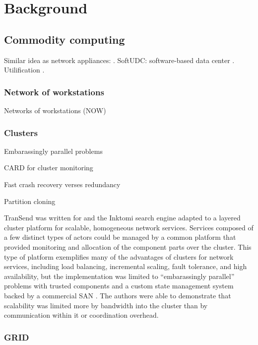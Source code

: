 \chapter{Background}



\section{Commodity computing}

Similar idea as network appliances: \cite{sapuntzakis03}. SoftUDC: software-based data center \cite{kallahalla}. Utilification \cite{wilkes04}.

\subsection{Network of workstations}
Networks of workstations (NOW)\cite{anderson95a}

\subsection{Clusters}

Embarassingly parallel problems

CARD for cluster monitoring\cite{anderson97}

Fast crash recovery verses redundancy\cite{baker94}

Partition cloning \cite{rauch}

TranSend was written for and the Inktomi search engine adapted to a layered cluster platform for scalable, homogeneous network services. Services composed of a few distinct types of actors could be managed by a common platform that provided monitoring and allocation of the component parts over the cluster. This type of platform exemplifies many of the advantages of clusters for network services, including load balancing, incremental scaling, fault tolerance, and high availability, but the implementation was limited to ``embarassingly parallel'' problems with trusted components and a custom state management system backed by a commercial SAN \cite{fox}. The authors were able to demonstrate that scalability was limited more by bandwidth into the cluster than by communication within it or coordination overhead.

\subsection{GRID}
\cite{zhao04}

